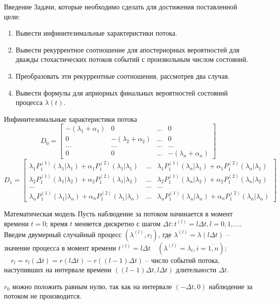 \documentclass{beamer}
\begin{document}
\begin{frame}{Введение}
    Задачи, которые необходимо сделать для достижения поставленной цели:
    \begin{enumerate}
        \item Вывести инфинитезимальные характеристики потока.
        \item Вывести рекуррентное соотношение для апостериорных вероятностей для дважды стохастических потоков событий с произвольным числом состояний.
        \item Преобразовать эти рекуррентные соотношения, рассмотрев два случая.
        \item Вывести формулы для априорных финальных вероятностей состояний процесса \(\lambda(t)\).
    \end{enumerate}
\end{frame}

\begin{frame}{Инфинитезимальные характеристики потока}
    \[D_0=
    \begin{bmatrix}
        -(\lambda_1+\alpha_1) & 0 & \dots & 0 \\
        0 & -(\lambda_2+\alpha_2) & \dots & 0 \\
        \dots & \dots & \dots & \dots \\
        0 & 0 & \dots & -(\lambda_n+\alpha_n)
    \end{bmatrix}
    \]
    {\color{black}
\small
\setlength{\arraycolsep}{2pt}
\[D_1=
    \begin{bmatrix}
        \lambda_1P_1^{(1)}(\lambda_1|\lambda_1)+\alpha_1P_1^{(2)}(\lambda_1|\lambda_1) & \dots & \lambda_1P_1^{(1)}(\lambda_n|\lambda_1)+\alpha_1P_1^{(2)}(\lambda_n|\lambda_1) \\
        \lambda_2P_1^{(1)}(\lambda_1|\lambda_2)+\alpha_2P_1^{(2)}(\lambda_1|\lambda_2) & \dots & \lambda_2P_1^{(1)}(\lambda_n|\lambda_2)+\alpha_2P_1^{(2)}(\lambda_n|\lambda_2) \\
        \dots & \dots &  \dots \\
        \lambda_nP_1^{(1)}(\lambda_1|\lambda_n)+\alpha_nP_1^{(2)}(\lambda_1|\lambda_n) & \dots & \lambda_nP_1^{(1)}(\lambda_n|\lambda_n)+\alpha_nP_1^{(2)}(\lambda_n|\lambda_n)
    \end{bmatrix}
\]
}
\end{frame}

\begin{frame}{Математическая модель}
    Пусть наблюдение за потоком начинается в момент времени \(t=0\); время \(t\) меняется дискретно с шагом \(\Delta t:t^{(l)}=l\Delta t, l=0,1,\dots \). Введем двумерный случайный процесс \((\lambda^{(l)},r_l)\), где \(\lambda^{(l)}=\lambda(l\Delta t)\) -- значение процесса в момент времени \(t^{(l)}=l\Delta t \quad (\lambda^{(l)}=\lambda_i, i=\overline{1,n})\);\(\quad r_l=r_l(\Delta t)=r(l\Delta t) - r((l-1)\Delta t)\) -- число событий потока, наступивших на интервале времени \(((l-1)\Delta t,l\Delta t)\) длительности \(\Delta t\). 
    \newline

    \(r_0\) можно положить равным нулю, так как на интервале \((-\Delta t,0)\) наблюдение за потоком не производится.
\end{frame}
\end{document}
